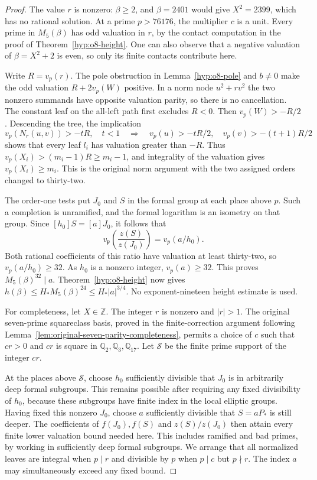 \documentclass[11pt]{article}
\theoremstyle{definition}
\theoremstyle{remark}
\newcommand{\Q}{\mathbb Q}
\newcommand{\Z}{\mathbb Z}
\begin{document}
\begin{proof}
The value $r$ is nonzero: $\beta\ge2$, and $\beta=2401$ would
give $X^2=2399$, which has no rational solution. At a prime
$p>76176$, the multiplier $c$ is a unit. Every prime in $M_5(\beta)$
has odd valuation in $r$, by the contact computation in the proof of
Theorem~\ref{hyp:o8-height}. One can also observe that a negative
valuation of $\beta=X^2+2$ is even, so only its finite contacts
contribute here.

Write $R=v_p(r)$. The pole obstruction in Lemma~\ref{hyp:o8-pole}
and $b\ne0$ make the odd valuation $R+2v_p(W)$ positive. In a
norm node $u^2+rv^2$ the two nonzero summands have opposite valuation
parity, so there is no cancellation. The constant leaf on the
all-left path first excludes $R<0$. Then $v_p(W)>-R/2$.
Descending the tree, the implication
\[
 v_p(N_r(u,v))>-tR,\quad t<1
 \quad\Longrightarrow\quad
 v_p(u)>-tR/2,\quad v_p(v)>-(t+1)R/2
\]
shows that every leaf $l_i$ has valuation greater than $-R$.
Thus $v_p(X_i)>(m_i-1)R\ge m_i-1$, and integrality of the
valuation gives $v_p(X_i)\ge m_i$. This is the original norm
argument with the two assigned orders changed to thirty-two.

The order-one tests put $J_0$ and $S$ in the formal group at each
place above $p$. Such a completion is unramified, and the formal
logarithm is an isometry on that group. Since
$[h_0]S=[a]J_0$, it follows that
\[
 v_{\mathfrak p}\!\left(\frac{z(S)}{z(J_0)}\right)
       =v_p(a/h_0).
\]
Both rational coefficients of this ratio have valuation at least
thirty-two, so $v_p(a/h_0)\ge32$. As $h_0$ is a nonzero integer,
$v_p(a)\ge32$. This proves $M_5(\beta)^{32}\mid a$.
Theorem~\ref{hyp:o8-height} now gives
$h(\beta)\le H_*M_5(\beta)^{24}\le H_*|a|^{3/4}$.
No exponent-nineteen height estimate is used.

For completeness, let $X\in\Z$. The integer $r$ is nonzero and
$|r|>1$. The original seven-prime squareclass basis, proved in the
finite-correction argument following
Lemma~\ref{lem:original-seven-parity-completeness}, permits a choice
of $c$ such that $cr>0$ and $cr$ is square in
$\Q_2,\Q_3,\Q_{17}$. Let $\mathcal S$ be the finite prime support
of the integer $cr$.

At the places above $\mathcal S$, choose $h_0$ sufficiently
divisible that $J_0$ is in arbitrarily deep formal subgroups.
This remains possible after requiring any fixed divisibility of
$h_0$, because these subgroups have finite index in the local
elliptic groups. Having fixed this nonzero $J_0$, choose $a$
sufficiently divisible that $S=aP_*$ is still deeper. The
coefficients of $f(J_0),f(S)$ and $z(S)/z(J_0)$ then attain every
finite lower valuation bound needed here. This includes ramified
and bad primes, by working in sufficiently deep formal subgroups.
We arrange that all normalized leaves are integral when $p\mid r$
and divisible by $p$ when $p\mid c$ but $p\nmid r$.
The index $a$ may simultaneously exceed any fixed bound.


\end{proof}
\end{document}
